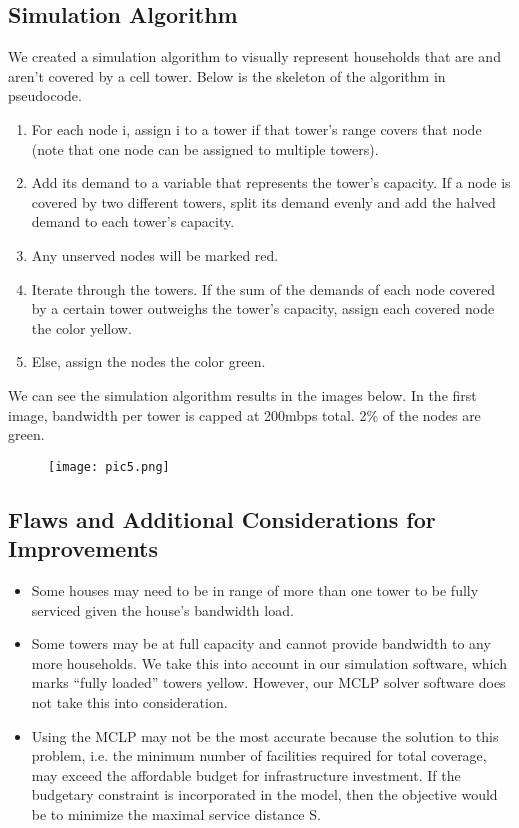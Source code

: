 	\subsection*{Simulation Algorithm}
	We created a simulation algorithm to visually represent households that are and aren't covered by a cell tower. Below is the skeleton of the algorithm in pseudocode.
	\begin{enumerate}
	\item For each node i, assign i to a tower if that tower’s range covers that node (note that one node can be assigned to multiple towers).
	\item Add its demand to a variable that represents the tower’s capacity. If a node is covered by two different towers, split its demand evenly and add the halved demand to each tower’s capacity.
	\item Any unserved nodes will be marked red.
	\item Iterate through the towers. If the sum of the demands of each node covered by a certain tower outweighs the tower’s capacity, assign each covered node the color yellow.
	\item Else, assign the nodes the color green.
	\end{enumerate}
	We can see the simulation algorithm results in the images below. In the first image, bandwidth per tower is capped at 200mbps total. 2\% of the nodes are green.
	\begin{figure}[h]
	\centering
	\texttt{[image: pic5.png]}
	\end{figure}
	
	\subsection*{Flaws and Additional Considerations for Improvements}
	\begin{itemize}
	\item Some houses may need to be in range of more than one tower to be fully serviced given the house’s bandwidth load.
	\item Some towers may be at full capacity and cannot provide bandwidth to any more households. We take this into account in our simulation software, which marks “fully loaded” towers yellow. However, our MCLP solver software does not take this into consideration.
	\item Using the MCLP may not be the most accurate because the solution to this problem, i.e. the minimum number of facilities required for total coverage, may exceed the affordable budget for infrastructure investment. If the budgetary constraint is incorporated in the model, then the objective would be to minimize the maximal service distance S.
	\end{itemize}
	
